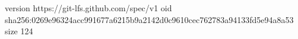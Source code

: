 version https://git-lfs.github.com/spec/v1
oid sha256:0269e96324acc991677a6215b9a2142d0c9610cec762783a94133fd5e94a8a53
size 124
